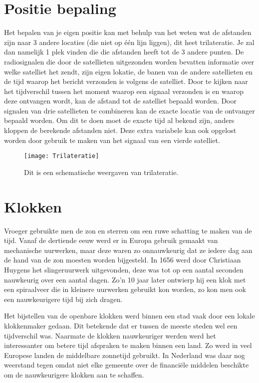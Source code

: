 \section{Positie bepaling}

Het bepalen van je eigen positie kan met behulp van het weten wat de
afstanden zijn naar 3 andere locaties (die niet op één lijn liggen), dit
heet trilateratie. Je zal dan namelijk 1 plek vinden die die afstanden
heeft tot de 3 andere punten. De radiosignalen die door de satellieten
uitgezonden worden bevatten informatie over welke satelliet het zendt,
zijn eigen lokatie, de banen van de andere satellieten en de tijd waarop
het bericht verzonden is volgens de satelliet. Door te kijken naar het
tijdverschil tussen het moment waarop een signaal verzonden is en waarop
deze ontvangen wordt, kan de afstand tot de satelliet bepaald worden.
Door signalen van drie satellieten te combineren kan de exacte locatie
van de ontvanger bepaald worden. Om dit te doen moet de exacte tijd al
bekend zijn, anders kloppen de berekende afstanden niet. Deze extra
variabele kan ook opgelost worden door gebruik te maken van het signaal
van een vierde satelliet.

\begin{figure}
    \centering
    \texttt{[image: Trilateratie]}
    \caption{Dit is een schematische weergaven van trilateratie.}
    \label{fig:Trilateratie}
\end{figure}


\section{Klokken}

Vroeger gebruikte men de zon en sterren om een ruwe schatting te maken
van de tijd. Vanaf de dertiende eeuw werd er in Europa gebruik
gemaakt van mechanische uurwerken, maar deze waren zo onnauwkeurig dat
ze iedere dag aan de hand van de zon moesten worden bijgesteld. In 1656
werd door Christiaan Huygens het slingeruurwerk uitgevonden, deze was
tot op een aantal seconden nauwkeurig over een aantal dagen. Zo'n 10
jaar later ontwierp hij een klok met een spiraalveer die in kleinere
uurwerken gebruikt kon worden, zo kon men ook een nauwkeurigere tijd bij
zich dragen.

Het bijstellen van de openbare klokken werd binnen een stad vaak door
een lokale klokkenmaker gedaan. Dit betekende dat er tussen de meeste
steden wel een tijdverschil was. Naarmate de klokken nauwkeuriger
werden werd het interessanter om betere tijd afspraken te maken binnen
een land. Zo werd in veel Europese landen de middelbare zonnetijd
gebruikt. In Nederland was daar nog weerstand tegen omdat niet elke
gemeente over de financiële middelen beschikte om de nauwkeurigere
klokken aan te schaffen.

